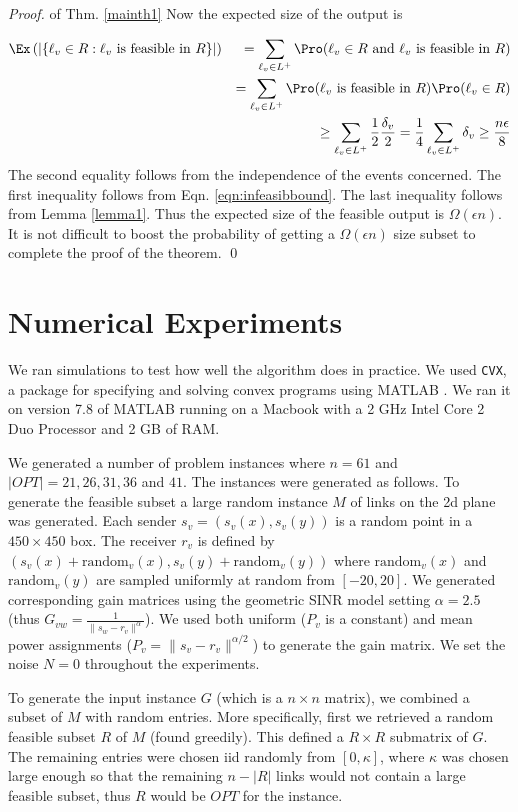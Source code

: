 \documentclass[11pt]{amsart}
\begin{document}
\begin{proof}{of Thm. \ref{mainth1}}
Now the expected size of the output is

\begin{eqnarray*}
\Ex\left(|\{\ell_v \in R : \ell_v \text{ is feasible in } R\}|\right)
&& = \sum_{\ell_v \in L^+} \Pro(\ell_v \in R \text{ and } \ell_v \text{ is feasible in } R) \\
&& = \sum_{\ell_v \in L^+} \Pro(\ell_v \text{ is feasible in } R) \Pro(\ell_v \in R) \\
&& \geq  \sum_{\ell_v \in L^+} \frac{1}{2} \frac{\delta_v}{2} 
  = \frac{1}{4}\sum_{\ell_v \in L^+} \delta_v \geq \frac{n \epsilon}{8} \label{eqn:infeasibbound}
\end{eqnarray*}
The second equality follows from the independence of the events concerned. 
The first inequality follows from Eqn. \ref{eqn:infeasibbound}.
The last
inequality follows from Lemma \ref{lemma1}.
Thus the expected size of the feasible output is $\Omega(\epsilon n)$.
It is not difficult to boost the probability of getting a $\Omega(\epsilon n)$ size subset to complete
the proof of the theorem. \qed
\end{proof}

\section{Numerical Experiments}
We ran  simulations to test how well the algorithm does in practice. We used \texttt{CVX}, a package for specifying and solving convex programs using MATLAB \cite{cvx}. We ran it on version 7.8 of MATLAB running on a Macbook with a 2 GHz Intel Core 2 Duo Processor and 2 GB of RAM. 

We generated a number of problem instances where $n = 61$ and $|OPT| = 21, 26, 31, 36$ and $41$. The instances
were generated as follows. To generate the feasible subset a large random instance $M$ of links on the 2d plane was generated. Each sender $s_v = (s_v(x), s_v(y))$ is a random point in a $450 \times 450$ box. The receiver $r_v$ is defined by $(s_v(x) + \text{random}_v(x), s_v(y) + \text{random}_v(y))$ where $\text{random}_v(x)$ and $\text{random}_v(y)$ are sampled uniformly at random from $[-20, 20]$. We generated  corresponding gain matrices using the geometric SINR model setting $\alpha = 2.5$ (thus $G_{vw} = \frac{1}{\|s_w - r_v\|^{\alpha}}$). We used both uniform ($P_v$ is a constant) and mean power assignments ($P_v = \|s_v - r_v\|^{\alpha/2}$) to generate the gain matrix. We set the noise $N = 0$ throughout the experiments.

To generate the input instance $G$ (which is a $n \times n$ matrix), we combined a subset of $M$ with random entries.
More specifically, first we retrieved a random feasible subset $R$ of $M$ (found greedily). This defined a
$R \times R$ submatrix of $G$. The remaining entries were chosen iid randomly from $[0, \kappa]$, where
$\kappa$ was chosen large enough so that the remaining $n - |R|$ links would not contain a large feasible subset, thus $R$ would be $OPT$ for the instance.
\end{document}
